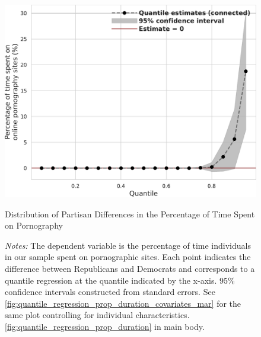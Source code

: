 \documentclass[12pt,twoside]{article}
\begin{document}
\begin{figure}[t]
	\centering
	\includegraphics[width=.7\linewidth]{figs/mar/quantile_reg_proportion_duration_adult.pdf}
	\caption{Distribution of Partisan Differences in the Percentage of Time Spent on Pornography}
	\caption*{\footnotesize \emph{Notes:} 
		The dependent variable is the percentage of time individuals in our sample spent on pornographic sites.
		Each point indicates the difference between Republicans and Democrats and corresponds to a quantile regression at the quantile indicated by the x-axis.
		95\% confidence intervals constructed from standard errors.
		See \cref{fig:quantile_regression_prop_duration_covariates_mar} for the same plot controlling for individual characteristics.
            \cref{fig:quantile_regression_prop_duration} in main body.
	}
	\label{fig:quantile_regression_prop_duration_mar}
\end{figure}
\end{document}
